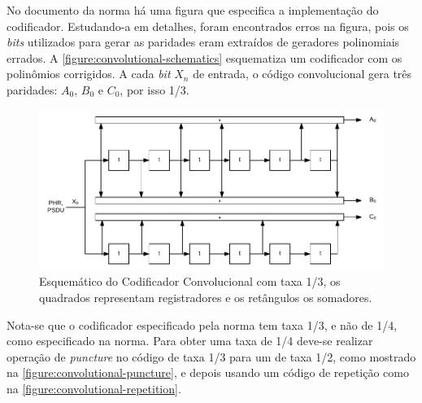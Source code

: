 	No documento da norma há uma figura que especifica a implementação do codificador. Estudando-a em detalhes, foram encontrados erros na figura, pois os \textit{bits} utilizados para gerar as paridades eram extraídos de geradores polinomiais errados. A \autoref{figure:convolutional-schematics} esquematiza um codificador com os polinômios corrigidos. A cada \textit{bit} $X_{n}$ de entrada, o código convolucional gera três paridades: $A_{0}$, $B_{0}$ e $C_{0}$, por isso 1/3.
	\begin{figure}[h!]
		\caption{\label{figure:convolutional-schematics}Esquemático do Codificador Convolucional com taxa 1/3, os quadrados representam registradores e os retângulos os somadores.}
		\centering
		\includegraphics[width=0.5\textheight]{convolutional/schematics.pdf}
	\end{figure}


	Nota-se que o codificador especificado pela norma tem taxa 1/3, e não de 1/4, como especificado na norma. Para obter uma taxa de 1/4 deve-se realizar operação de \textit{puncture} no código de taxa 1/3 para um de taxa 1/2, como mostrado na \autoref{figure:convolutional-puncture}, e depois usando um código de repetição como na \autoref{figure:convolutional-repetition}.
	
